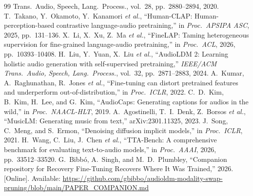 {\begin{thebibliography}{99}
{Trans.\ Audio, Speech, Lang.\ Process.}, vol.~28, pp.~2880--2894, 2020.
 T.~Takano, Y.~Okamoto, Y.~Kanamori \emph{et al.}, ``Human-CLAP:
Human-perception-based contrastive language-audio pretraining,'' in \emph{Proc.\ APSIPA ASC}, 2025,
pp.~131--136.
 X.~Li, X.~Xu, Z.~Ma \emph{et al.}, ``FineLAP: Taming
heterogeneous supervision for fine-grained language-audio pretraining,'' in \emph{Proc.\ ACL}, 2026,
pp.~10393--10408.
 H.~Liu, Y.~Yuan, X.~Liu \emph{et al.}, ``AudioLDM 2: Learning holistic audio generation with self-supervised
pretraining,'' \emph{IEEE/ACM Trans.\ Audio, Speech, Lang.\ Process.}, vol.~32, pp.~2871--2883, 2024.
 A.~Kumar, A.~Raghunathan, R.~Jones \emph{et al.}, ``Fine-tuning
can distort pretrained features and underperform out-of-distribution,'' in \emph{Proc.\ ICLR}, 2022.
 C.~D.~Kim, B.~Kim, H.~Lee, and G.~Kim, ``AudioCaps: Generating captions
for audios in the wild,'' in \emph{Proc.\ NAACL-HLT}, 2019.
 A.~Agostinelli, T.~I.~Denk, Z.~Borsos \emph{et al.}, ``MusicLM:
Generating music from text,'' arXiv:2301.11325, 2023.
 J.~Song, C.~Meng, and S.~Ermon, ``Denoising diffusion implicit models,'' in
\emph{Proc.\ ICLR}, 2021.
 H.~Wang, C.~Liu, J.~Chen \emph{et al.}, ``TTA-Bench: A comprehensive benchmark for evaluating text-to-audio models,'' in \emph{Proc.\ AAAI}, 2026, pp.~33512--33520.
 G.~Bibb\'o, A.~Singh, and M.~D.~Plumbley, ``Companion repository for Recovery Fine-Tuning Recovers Where It Was Trained,'' 2026. [Online]. Available: \url{https://github.com/gbibbo/audioldm-modality-swap-pruning/blob/main/PAPER_COMPANION.md}
\end{thebibliography}}


